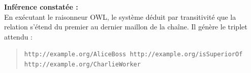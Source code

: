 \documentclass[11pt,a4paper]{article}
\begin{document}
\textbf{Inférence constatée :} \\
En exécutant le raisonneur OWL, le système déduit par transitivité que la relation s'étend du premier au dernier maillon de la chaîne. Il génère le triplet attendu :
\begin{quote}
\texttt{http://example.org/AliceBoss http://example.org/isSuperiorOf \\ http://example.org/CharlieWorker}
\end{quote}
\end{document}
